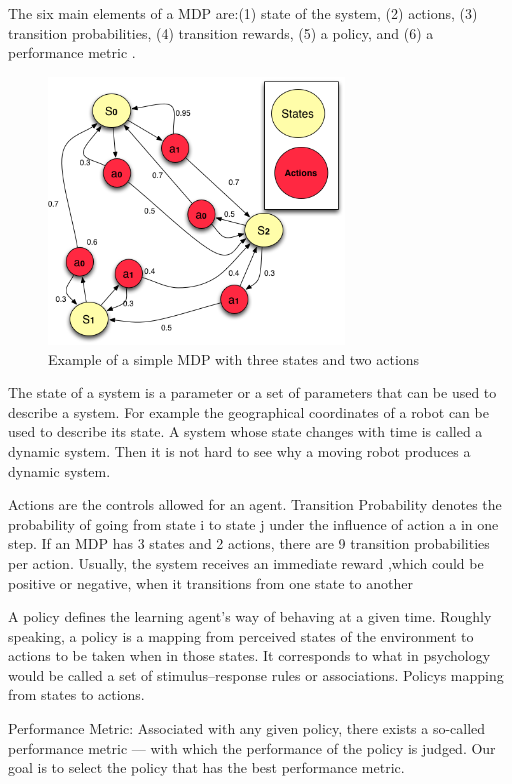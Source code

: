 The six main elements of a MDP are:(1) state of the system, (2) actions, (3) transition probabilities, (4) transition rewards, (5) a policy, and (6) a performance metric \cite{Sutton2012}.

\begin{figure}
\centering
\includegraphics[width=0.7\textwidth]{./images/mdp1.png}
\caption{Example of a simple MDP with three states and two actions}
\label{fig:mdp}
\end{figure}


The state of a system is a parameter or a set of parameters that can be used to describe a system. For example the geographical coordinates of a robot can be used to
describe its state. A system whose state changes with time is called a dynamic system. Then it is not hard to see why a moving robot produces a dynamic system.

Actions are the controls allowed for an agent. Transition Probability denotes the probability of going from state i to state j under the influence of action a in one step. If an MDP has 3 states and 2 actions, there are 9 transition probabilities per action. Usually, the system receives an immediate reward ,which could be positive or negative, when it transitions from one state to another

A policy defines the learning agent’s way of behaving at a given time. Roughly speaking, a policy is a mapping from perceived states of the environment
to actions to be taken when in those states. It corresponds to what in
psychology would be called a set of stimulus–response rules or associations.  Policys mapping from states to actions.

Performance Metric: Associated with any given policy, there exists a so-called performance
metric — with which the performance of the policy is judged. Our goal is to select the policy
that has the best performance metric. 


